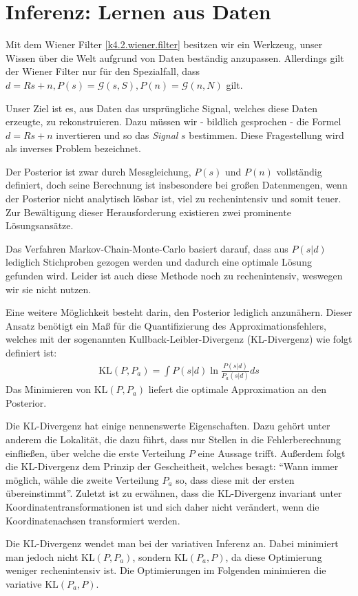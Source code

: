 \section{Inferenz: Lernen aus Daten}
Mit dem Wiener Filter \cref{k4.2.wiener.filter} besitzen wir ein Werkzeug, unser Wissen über die Welt aufgrund von Daten beständig anzupassen. Allerdings gilt der Wiener Filter nur für den Spezialfall, dass $d=Rs+n, P(s)=\mathcal{G}(s,S), P(n) = \mathcal{G}(n,N)$ gilt.

Unser Ziel ist es, aus Daten das ursprüngliche Signal, welches diese Daten erzeugte, zu rekonstruieren. Dazu müssen wir - bildlich gesprochen - die Formel $d=Rs+n$ invertieren und so das \emph{Signal} $s$ bestimmen. Diese Fragestellung wird als inverses Problem bezeichnet.

Der Posterior ist zwar durch Messgleichung, $P(s)$ und $P(n)$ vollständig definiert, doch seine Berechnung ist insbesondere bei großen Datenmengen, wenn der Posterior nicht analytisch lösbar ist, viel zu rechenintensiv und somit teuer. Zur Bewältigung dieser Herausforderung existieren zwei prominente Lösungsansätze.

Das Verfahren Markov-Chain-Monte-Carlo basiert darauf, dass aus $P(s|d)$ lediglich Stichproben gezogen werden und dadurch eine optimale Lösung gefunden wird. Leider ist auch diese Methode noch zu rechenintensiv, weswegen wir sie nicht nutzen.

Eine weitere Möglichkeit besteht darin, den Posterior lediglich anzunähern. Dieser Ansatz benötigt ein Maß für die Quantifizierung des Approximationsfehlers, welches mit der sogenannten Kullback-Leibler-Divergenz (KL-Divergenz) wie folgt definiert ist:
\begin{eqnarray}
\text{KL}(P,P_a) = \int P(s|d) \ln \frac{P(s|d)}{P_a(s|d)} ds
\end{eqnarray}
Das Minimieren von $\text{KL}(P, P_a)$ liefert die optimale Approximation an den Posterior.

Die KL-Divergenz hat einige nennenswerte Eigenschaften. Dazu gehört unter anderem die Lokalität, die dazu führt, dass nur Stellen in die Fehlerberechnung einfließen, über welche die erste Verteilung $P$ eine Aussage trifft. Außerdem folgt die KL-Divergenz dem Prinzip der Gescheitheit, welches besagt: \enquote{Wann immer möglich, wähle die zweite Verteilung $P_a$ so, dass diese mit der ersten übereinstimmt}. Zuletzt ist zu erwähnen, dass die KL-Divergenz invariant unter Koordinatentransformationen ist und sich daher nicht verändert, wenn die Koordinatenachsen transformiert werden.

Die KL-Divergenz wendet man bei der variativen Inferenz an. Dabei minimiert man jedoch nicht $\text{KL}(P, P_a)$, sondern $\text{KL}(P_a, P)$, da diese Optimierung weniger rechenintensiv ist. Die Optimierungen im Folgenden minimieren die variative $\text{KL}(P_a, P)$.